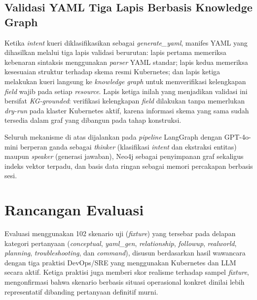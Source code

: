 \documentclass{ieeeaccess}
\begin{document}
\subsection{Validasi YAML Tiga Lapis Berbasis Knowledge Graph}

Ketika \textit{intent} kueri diklasifikasikan sebagai \textit{generate\_yaml}, manifes YAML yang dihasilkan melalui tiga lapis validasi berurutan: lapis pertama memeriksa kebenaran sintaksis menggunakan \textit{parser} YAML standar; lapis kedua memeriksa kesesuaian struktur terhadap skema resmi Kubernetes; dan lapis ketiga melakukan kueri langsung ke \textit{knowledge graph} untuk memverifikasi kelengkapan \textit{field} wajib pada setiap \textit{resource}. Lapis ketiga inilah yang menjadikan validasi ini bersifat \textit{KG-grounded}: verifikasi kelengkapan \textit{field} dilakukan tanpa memerlukan \textit{dry-run} pada klaster Kubernetes aktif, karena informasi skema yang sama sudah tersedia dalam graf yang dibangun pada tahap konstruksi.

Seluruh mekanisme di atas dijalankan pada \textit{pipeline} LangGraph dengan GPT-4o-mini berperan ganda sebagai \textit{thinker} (klasifikasi \textit{intent} dan ekstraksi entitas) maupun \textit{speaker} (generasi jawaban), Neo4j sebagai penyimpanan graf sekaligus indeks vektor terpadu, dan basis data ringan sebagai memori percakapan berbasis sesi.

\section{Rancangan Evaluasi}
\label{sec:evaluasi}

Evaluasi menggunakan 102 skenario uji (\textit{fixture}) yang tersebar pada delapan kategori pertanyaan (\textit{conceptual}, \textit{yaml\_gen}, \textit{relationship}, \textit{followup}, \textit{realworld}, \textit{planning}, \textit{troubleshooting}, dan \textit{command}), disusun berdasarkan hasil wawancara dengan tiga praktisi DevOps/SRE yang menggunakan Kubernetes dan LLM secara aktif. Ketiga praktisi juga memberi skor realisme terhadap sampel \textit{fixture}, mengonfirmasi bahwa skenario berbasis situasi operasional konkret dinilai lebih representatif dibanding pertanyaan definitif murni.
\end{document}
